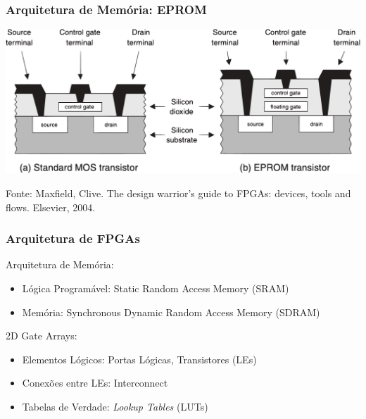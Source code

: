 \documentclass[10pt, compress, aspectratio=169, xcolor={table,usenames,dvipsnames}]{beamer}
\begin{document}
\begin{frame}
    \frametitle{Arquitetura de Memória: EPROM}
    \begin{center}
        \includegraphics[width=.65\textwidth]{eprom-transistor}
    \end{center}

    \vfill

    \begin{center}
        \scriptsize{Fonte: Maxfield, Clive. The design warrior's guide to FPGAs: devices, tools and flows. Elsevier, 2004.}
    \end{center}
\end{frame}

\begin{frame}
    \frametitle{Arquitetura de FPGAs}
    Arquitetura de Memória:
    \begin{itemize}
        \item Lógica Programável: Static Random Access Memory (\alert{SRAM})
        \item Memória: Synchronous Dynamic Random Access Memory (\alert{SDRAM})
    \end{itemize}

    \alert{2D Gate Arrays}:

    \begin{itemize}
        \item Elementos Lógicos: Portas Lógicas, Transistores (\alert{LEs})
        \item Conexões entre LEs: \alert{Interconnect}
        \item Tabelas de Verdade: \textit{Lookup Tables} (\alert{LUTs})
    \end{itemize}
\end{frame}
\end{document}
